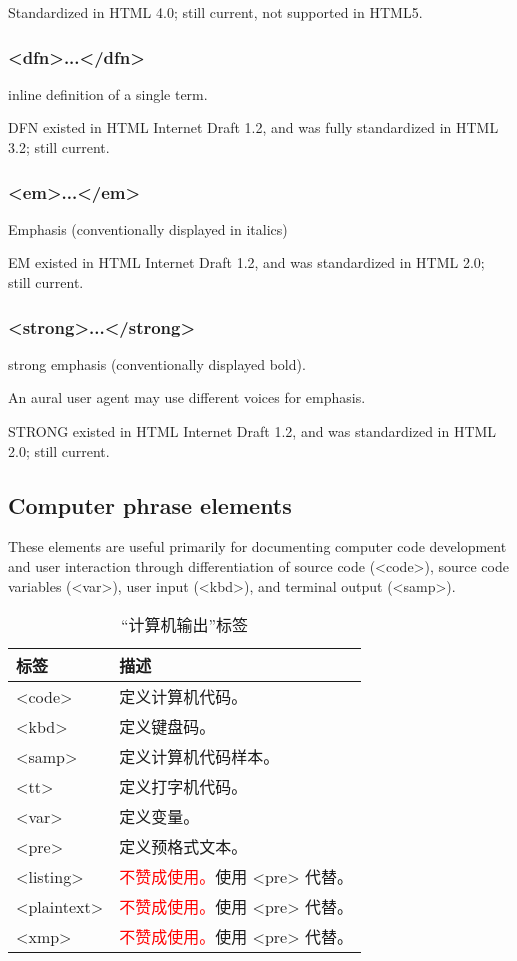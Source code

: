 Standardized in HTML 4.0; still current, not supported in HTML5.

\subsubsection{<dfn>...</dfn>}


inline definition of a single term.

DFN existed in HTML Internet Draft 1.2, and was fully standardized in HTML 3.2; still current.


\subsubsection{<em>...</em>}


Emphasis (conventionally displayed in italics)

EM existed in HTML Internet Draft 1.2, and was standardized in HTML 2.0; still current.


\subsubsection{<strong>...</strong>}


strong emphasis (conventionally displayed bold).

An aural user agent may use different voices for emphasis.

STRONG existed in HTML Internet Draft 1.2, and was standardized in HTML 2.0; still current.


\subsection{Computer phrase elements}

These elements are useful primarily for documenting computer code development and user interaction through differentiation of source code (<code>), source code variables (<var>), user input (<kbd>), and terminal output (<samp>).

\begin{table}[!h]
\centering
\caption{“计算机输出”标签}
\begin{tabular}{|l|l|}
\hline
标签		&描述						\\
\hline
<code>	&定义计算机代码。			\\
\hline
<kbd>	&定义键盘码。				\\
\hline
<samp>	&定义计算机代码样本。		\\
\hline
<tt>		&定义打字机代码。			\\
\hline
<var>	&定义变量。					\\
\hline
<pre>	&定义预格式文本。			\\
\hline
<listing>	&\textcolor{Red}{不赞成使用。}使用 <pre> 代替。\\
\hline
<plaintext>&\textcolor{Red}{不赞成使用。}使用 <pre> 代替。\\
\hline
<xmp>	&\textcolor{Red}{不赞成使用。}使用 <pre> 代替。\\
\hline
\end{tabular}
\end{table}

